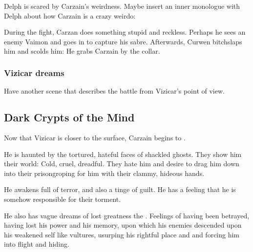 Delph is scared by Carzain's weirdness. Maybe insert an inner monologue with Delph about how Carzain is a crazy weirdo: 

During the fight, Carzan does something stupid and reckless. 
Perhaps he sees an enemy Vaimon and goes in to capture his sabre. 
Afterwards, Curwen bitchslaps him and scolds him: 
He grabs Carzain by the collar. 





\subsubsection{Vizicar dreams}
Have another scene that describes the battle from Vizicar's point of view. 










\subsection{Dark Crypts of the Mind}
Now that Vizicar is closer to the surface, Carzain begins to . 

He is haunted by the tortured, hateful faces of shackled ghosts. They show him their world: Cold, cruel, dreadful. They hate him and desire to drag him down into their prison\dash groping for him with their clammy, hideous hands. 

He awakens full of terror, and also a tinge of guilt. He has a feeling that he is somehow responsible for their torment. 

He also has vague dreams of lost greatness\dash {} the . Feelings of having been betrayed, having lost his power and his memory, upon which his enemies descended upon his weakened self like vultures, usurping his rightful place and \honour and forcing him into flight and hiding. 

